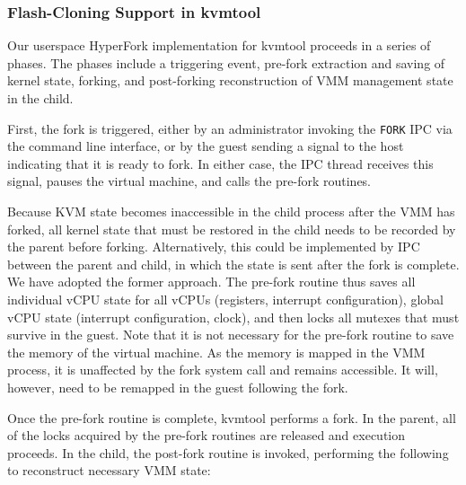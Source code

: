 \subsubsection{Flash-Cloning Support in kvmtool}

Our userspace HyperFork implementation for kvmtool proceeds in a series of
phases. The phases include a triggering event, pre-fork extraction and saving
of kernel state, forking, and post-forking reconstruction of VMM management
state in the child.

First, the fork is triggered, either by an administrator invoking the
\texttt{FORK} IPC via the command line interface, or by the guest sending a
signal to the host indicating that it is ready to fork. In either case, the IPC
thread receives this signal, pauses the virtual machine, and calls the pre-fork
routines.

Because KVM state becomes inaccessible in the child process after the VMM has
forked, all kernel state that must be restored in the child needs to be
recorded by the parent before forking. Alternatively, this could be implemented
by IPC between the parent and child, in which the state is sent after the fork
is complete. We have adopted the former approach. The pre-fork routine thus
saves all individual vCPU state for all vCPUs (registers, interrupt
configuration), global vCPU state (interrupt configuration, clock), and then
locks all mutexes that must survive in the guest. Note that it is not necessary
for the pre-fork routine to save the memory of the virtual machine. As the
memory is mapped in the VMM process, it is unaffected by the fork system call
and remains accessible. It will, however, need to be remapped in the guest
following the fork.

Once the pre-fork routine is complete, kvmtool performs a fork. In the
parent, all of the locks acquired by the pre-fork routines are released and
execution proceeds. In the child, the post-fork routine is invoked, performing
the following to reconstruct necessary VMM state:

